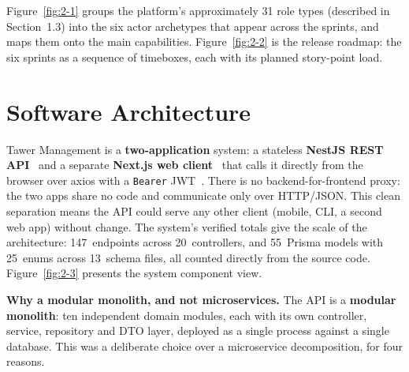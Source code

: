 Figure~\ref{fig:2-1} groups the platform's approximately 31 role types (described in
Section~1.3) into the six actor archetypes that appear across the sprints, and maps them onto
the main capabilities. Figure~\ref{fig:2-2} is the release roadmap: the six sprints as a
sequence of timeboxes, each with its planned story-point load.

{\renewcommand{\figmaxheight}{0.75\textheight}%
}


\section{Software Architecture}

Tawer Management is a \textbf{two-application} system: a stateless \textbf{NestJS REST
API}~\cite{nestjs} and a separate \textbf{Next.js web client}~\cite{nextjs} that calls it
directly from the browser over axios with a \texttt{Bearer} JWT~\cite{jwt}. There is no
backend-for-frontend proxy: the two apps share no code and communicate only over HTTP/JSON.
This clean separation means the API could serve any other client (mobile, CLI, a second web
app) without change. The system's verified totals give the scale of the architecture:
147~endpoints across 20~controllers, and 55~Prisma models with 25~enums across 13~schema
files, all counted directly from the source code. Figure~\ref{fig:2-3} presents the system
component view.

{\renewcommand{\figmaxheight}{0.50\textheight}%
}

\textbf{Why a modular monolith, and not microservices.} The API is a \textbf{modular monolith}:
ten independent domain modules, each with its own controller, service, repository and DTO layer,
deployed as a single process against a single database. This was a deliberate choice over a
microservice decomposition, for four reasons.

